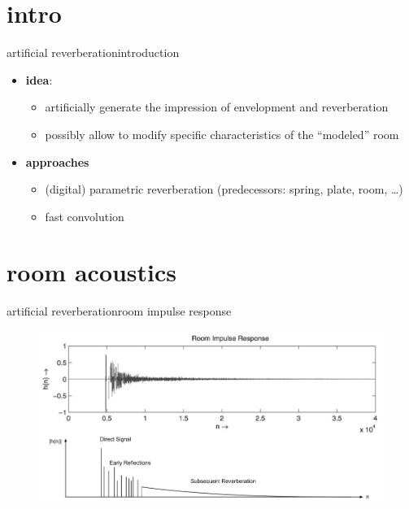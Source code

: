 



\subtitle{Part 20: Reverb}


	

\section{intro}
\begin{frame}{artificial reverberation}{introduction}
	\begin{itemize}
		\item	\textbf{idea}:\\
				\begin{itemize}
					\item	artificially generate the impression of envelopment and reverberation
					\item	possibly allow to modify specific characteristics of the ``modeled'' room
				\end{itemize}
		\pause
        \bigskip
		\item	\textbf{approaches}
			\begin{itemize}
				\item	(digital) parametric reverberation (predecessors: spring, plate, room, \ldots)
				\item	fast convolution
			\end{itemize}	
	\end{itemize}
\end{frame}

\section{room acoustics}
\begin{frame}{artificial reverberation}{room impulse response}
	\begin{figure}
		\centerline{\includegraphics[scale=.4]{graph/IR}}
	\end{figure}
\end{frame}

